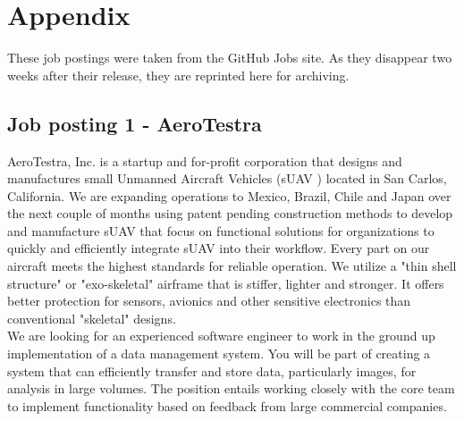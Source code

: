 \chapter{Appendix}\label{chap:appendix}
These job postings were taken from the GitHub Jobs site. As they disappear
two weeks after their release, they are reprinted here for archiving.

\section{Job posting 1 - AeroTestra}\label{sec:job-posting-one}
AeroTestra, Inc. is a startup and for-profit corporation that designs and
manufactures small Unmanned Aircraft Vehicles (sUAV ) located in San Carlos,
California. We are expanding operations to Mexico, Brazil, Chile and Japan over the
next couple of months using patent pending construction methods to develop and
manufacture sUAV that focus on functional solutions for organizations to quickly
and efficiently integrate sUAV into their workflow. Every part on our aircraft meets
the highest standards for reliable operation. We utilize a "thin shell structure" or
"exo-skeletal" airframe that is stiffer, lighter and stronger. It offers better protection for sensors, avionics and other sensitive electronics than conventional "skeletal" designs.\\

We are looking for an experienced software engineer to work in the ground up implementation of a data management system. You will be part of creating a system that
can efficiently transfer and store data, particularly images, for analysis in large volumes. The position entails working closely with the core team to implement functionality based on feedback from large commercial companies.

